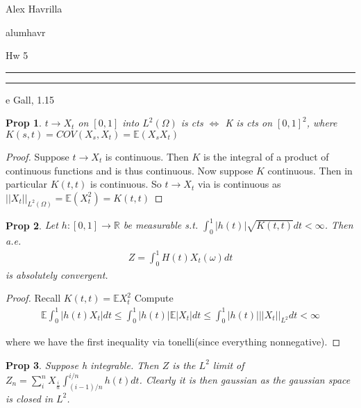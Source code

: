 \documentclass[11pt]{article}
\newcommand{\R}{\mathbb{R}}
\newcommand{\E}{\mathbb{E}}
\newcommand{\norm}[1]{||#1||}
\newcommand{\question}[2] {\vspace{.25in} \hrule\vspace{0.5em}
\noindent{\bf #1: #2} \vspace{0.5em}
\hrule \vspace{.10in}}
\newcommand{\myname}{Alex Havrilla}
\newcommand{\myandrew}{alumhavr}
\newcommand{\myhwnum}{Hw 5}
\newtheorem{prop}{Prop}
\begin{document}
\medskip                        

\thispagestyle{plain}
\begin{center}

{\myname}

\myandrew

\myhwnum

\end{center}

\question{Question 1(1.15)}

Le Gall, 1.15


\begin{prop}
	$t \to X_t$ on $[0,1]$ into $L^2(\Omega)$ is cts $\iff$ K is cts on $[0,1]^2$, where $K(s,t) = COV(X_s,X_t) = \E(X_sX_t)$
\end{prop}

\begin{proof}
	Suppose $t \to X_t$ is continuous. Then $K$ is the integral of a product of continuous functions and is thus continuous. 
	Now suppose $K$ continuous. Then in particular $K(t,t)$ is continuous. So $t \to X_t$ via is continuous as $\norm{X_t}_{L^2(\Omega)} = \E(X_t^2) = K(t,t)$
\end{proof}

\begin{prop}
	Let $h : [0,1] \to \R$ be measurable s.t. $\int_0^1 |h(t)| \sqrt{K(t,t)} dt < \infty$. Then a.e. 
		\begin{align*}
			Z=\int_0^1 H(t) X_t(\omega)dt
		\end{align*}
		is absolutely convergent.
\end{prop}

\begin{proof}
	Recall $K(t,t) = \E X_t^2$
	Compute
	\begin{align*}
		\E \int_0^1 |h(t)X_t|dt \leq \int_0^1 |h(t)|\E |X_t|dt \leq \int_0^1 |h(t)| \norm{X_t}_{L^2}dt < \infty
	\end{align*}

	where we have the first inequality via tonelli(since everything nonnegative).
\end{proof}

\begin{prop}
	Suppose h integrable. Then $Z$ is the $L^2$ limit of $Z_n = \sum_i^n X_{\frac{i}{n}} \int_{(i-1)/n}^{i/n} h(t)dt$. Clearly it is then gaussian as the gaussian space is closed in $L^2$.
\end{prop}
\end{document}
